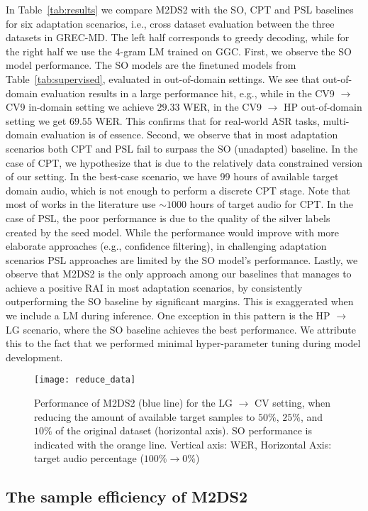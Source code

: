 \documentclass[journal]{IEEEtran}
\begin{document}
In Table~\ref{tab:results} we compare M2DS2 with the SO, CPT and PSL baselines for six adaptation scenarios, i.e., cross dataset evaluation between the three datasets in GREC-MD. The left half corresponds to greedy decoding, while for the right half we use the 4-gram LM trained on GGC.
First, we observe the SO model performance. The SO models are the finetuned models from Table~\ref{tab:supervised}, evaluated in out-of-domain settings. We see that out-of-domain evaluation results in a large performance hit, e.g., while in the CV9 $\rightarrow$ CV9 in-domain setting we achieve $29.33$ WER,  in the CV9  $\rightarrow$ HP out-of-domain setting we get $69.55$ WER. This confirms that for real-world ASR tasks, multi-domain evaluation is of essence. Second, we observe that in most adaptation scenarios both CPT and PSL fail to surpass the SO (unadapted) baseline. In the case of CPT, we hypothesize that is due to the relatively data constrained version of our setting. In the best-case scenario, we have $99$ hours of available target domain audio, which is not enough to perform a discrete CPT stage. Note that most of works in the literature use $\sim 1000$ hours of target audio for CPT. In the case of PSL, the poor performance is due to the quality of the silver labels created by the seed model. While the performance would improve with more elaborate approaches (e.g., confidence filtering), in challenging adaptation scenarios PSL approaches are limited by the SO model's performance.
Lastly, we observe that M2DS2 is the only approach among our baselines that manages to achieve a positive RAI in most adaptation scenarios, by consistently outperforming the SO baseline by significant margins. This is exaggerated when we include a LM during inference.
One exception in this pattern is the HP $\rightarrow$ LG scenario, where the SO baseline achieves the best performance. We attribute this to the fact that we performed minimal hyper-parameter tuning during model development.

\begin{figure}
    \centering
    \texttt{[image: reduce\_data]}
    \caption{Performance of M2DS2 (blue line) for the LG $\rightarrow$ CV setting, when reducing the amount of available target samples to $50\%$, $25\%$, and $10\%$ of the original dataset (horizontal axis). SO performance is indicated with the orange line. Vertical axis: WER, Horizontal Axis: target audio percentage ($100\%\rightarrow 0\%$) }
    \label{fig:sample-eff}
\end{figure}
\subsection{The sample efficiency of M2DS2}
\label{sec:sample-eff}
\end{document}
